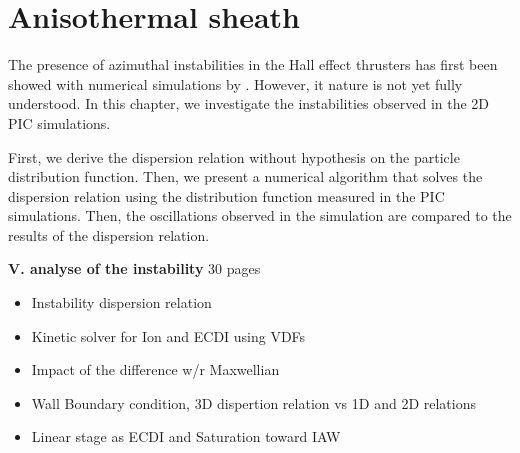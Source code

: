 



\chapter{Anisothermal sheath}
\label{ch-3}

The presence of azimuthal instabilities in the Hall effect thrusters has first been showed with numerical simulations by \citet{adam2004}.
However, it nature is not yet fully understood.
In this chapter, we investigate the instabilities observed in the \ac{2D} \ac{PIC} simulations.

First, we derive the dispersion relation without hypothesis on the particle distribution function.
Then, we present a numerical algorithm that solves the dispersion relation using the distribution function measured in the \ac{PIC} simulations.
Then, the oscillations observed in the simulation are compared to the results of the dispersion relation.



{\bf V. analyse of the instability } 30 pages
\begin{zzz}
  \begin{itemize}
\item Instability dispersion relation
\item Kinetic solver for Ion and ECDI using VDFs
\item Impact of the difference w/r Maxwellian
\item Wall Boundary condition, 3D dispertion relation vs 1D and 2D relations
\item Linear stage as ECDI and Saturation toward IAW
\end{itemize}
\end{zzz}

\minitoc

